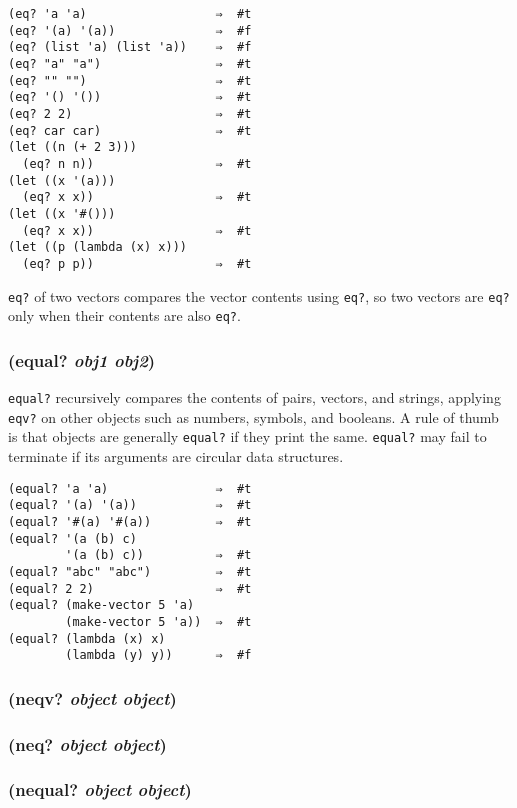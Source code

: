 \documentclass{article}
\begin{document}
\begin{verbatim}
(eq? 'a 'a)                  ⇒  #t
(eq? '(a) '(a))              ⇒  #f
(eq? (list 'a) (list 'a))    ⇒  #f
(eq? "a" "a")                ⇒  #t
(eq? "" "")                  ⇒  #t
(eq? '() '())                ⇒  #t
(eq? 2 2)                    ⇒  #t
(eq? car car)                ⇒  #t
(let ((n (+ 2 3)))
  (eq? n n))                 ⇒  #t
(let ((x '(a)))
  (eq? x x))                 ⇒  #t
(let ((x '#()))
  (eq? x x))                 ⇒  #t
(let ((p (lambda (x) x)))
  (eq? p p))                 ⇒  #t
\end{verbatim}

\verb|eq?| of two vectors compares the vector contents using \verb|eq?|, so two
vectors are \verb|eq?| only when their contents are also \verb|eq?|.

\subsubsection{(equal? \emph{obj1} \emph{obj2})}

\verb|equal?| recursively compares the contents of pairs, vectors, and strings,
applying \verb|eqv?| on other objects such as numbers, symbols, and booleans. A
rule of thumb is that objects are generally \verb|equal?| if they print the same.
\verb|equal?| may fail to terminate if its arguments are circular data structures.

\begin{verbatim}
(equal? 'a 'a)               ⇒  #t
(equal? '(a) '(a))           ⇒  #t
(equal? '#(a) '#(a))         ⇒  #t
(equal? '(a (b) c)
        '(a (b) c))          ⇒  #t
(equal? "abc" "abc")         ⇒  #t
(equal? 2 2)                 ⇒  #t
(equal? (make-vector 5 'a)
        (make-vector 5 'a))  ⇒  #t
(equal? (lambda (x) x)
        (lambda (y) y))      ⇒  #f
\end{verbatim}

\subsubsection{(neqv? \emph{object} \emph{object})}

\subsubsection{(neq? \emph{object} \emph{object})}

\subsubsection{(nequal? \emph{object} \emph{object})}
\end{document}
